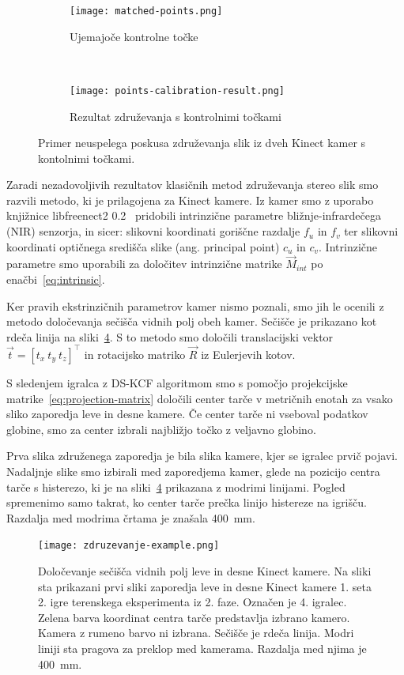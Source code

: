 \begin{figure}[!htb]
	\centering
	\begin{subfigure}[t]{0.45\columnwidth}
		\texttt{[image: matched-points.png]}
		\caption{Ujemajoče kontrolne točke}
		\label{fig:zdruzevanje-ujemajoce-cp}
	\end{subfigure}
	~
	\begin{subfigure}[t]{0.45\columnwidth}
		\texttt{[image: points-calibration-result.png]}
		\caption{Rezultat združevanja s kontrolnimi točkami}
		\label{fig:zdruzevanje-result-cp}
	\end{subfigure}
	\caption[Neuspelo združevanje slik s kontrolnimi točkami]{Primer neuspelega poskusa združevanja slik iz dveh Kinect kamer s kontolnimi točkami.}
	\label{fig:zdruzevanje-cp}
\end{figure}

Zaradi nezadovoljivih rezultatov klasičnih metod združevanja stereo slik smo razvili metodo, ki je prilagojena za Kinect kamere. Iz kamer smo z uporabo knjižnice libfreenect2 0.2~\cite{lingzhu2016libfreenect2} pridobili intrinzične parametre bližnje-infrardečega (NIR) senzorja, in sicer: slikovni koordinati goriščne razdalje $f_u$ in $f_v$ ter slikovni koordinati optičnega središča slike (ang. principal point) $c_u$ in $c_v$. Intrinzične parametre smo uporabili za določitev intrinzične matrike $\vec{M}_{int}$ po enačbi~\eqref{eq:intrinsic}.

Ker pravih ekstrinzičnih parametrov kamer nismo poznali, smo jih le ocenili z metodo določevanja sečišča vidnih polj obeh kamer. Sečišče je prikazano kot rdeča linija na sliki~\ref{fig:zdruzevanje}. S to metodo smo določili translacijski vektor $\vec{t} = \left [ t_x~ t_y~ t_z \right]^\top$ in rotacijsko matriko $\vec{R}$ iz Eulerjevih kotov.

S sledenjem igralca z DS-KCF algoritmom smo s pomočjo projekcijske matrike~\eqref{eq:projection-matrix} določili center tarče v metričnih enotah za vsako sliko zaporedja leve in desne kamere. Če center tarče ni vseboval podatkov globine, smo za center izbrali najbližjo točko z veljavno globino.

Prva slika združenega zaporedja je bila slika kamere, kjer se igralec prvič pojavi. Nadaljnje slike smo izbirali med zaporedjema kamer, glede na pozicijo centra tarče s histerezo, ki je na sliki~\ref{fig:zdruzevanje} prikazana z modrimi linijami. Pogled spremenimo samo takrat, ko center tarče prečka linijo histereze na igrišču. Razdalja med modrima črtama je znašala \SI{400}{mm}.


\begin{figure}[!htb]
	\centering
	\texttt{[image: zdruzevanje-example.png]}
	\caption[Določevanje sečišča vidnih polj leve in desne Kinect kamere]{Določevanje sečišča vidnih polj leve in desne Kinect kamere. Na sliki sta prikazani prvi sliki zaporedja leve in desne Kinect kamere 1. seta 2. igre terenskega eksperimenta iz 2. faze. Označen je 4. igralec. Zelena barva koordinat centra tarče predstavlja izbrano kamero. Kamera z rumeno barvo ni izbrana. Sečišče je rdeča linija. Modri liniji sta pragova za preklop med kamerama. Razdalja med njima je \SI{400}{mm}.}
	\label{fig:zdruzevanje}
\end{figure}

